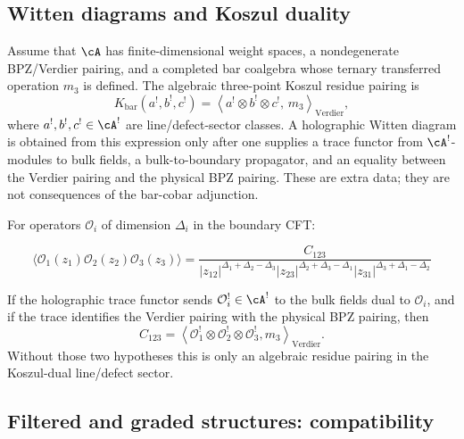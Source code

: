 \subsection{Witten diagrams and Koszul duality}

\begin{technique}
Assume that $\cA$ has finite-dimensional weight spaces, a
nondegenerate BPZ/Verdier pairing, and a completed bar coalgebra whose
ternary transferred operation $m_3$ is defined. The algebraic
three-point Koszul residue pairing is
\[
K_{\mathrm{bar}}(a^!,b^!,c^!)
=
\left\langle a^!\otimes b^!\otimes c^!,\,m_3\right\rangle_{\mathrm{Verdier}},
\]
where $a^!,b^!,c^!\in\cA^!$ are line/defect-sector classes. A
holographic Witten diagram is obtained from this expression only after
one supplies a trace functor from $\cA^!$-modules to bulk fields, a
bulk-to-boundary propagator, and an equality between the Verdier
pairing and the physical BPZ pairing. These are extra data; they are
not consequences of the bar-cobar adjunction.
\end{technique}

\begin{example}
For operators $\mathcal{O}_i$ of dimension $\Delta_i$ in the boundary CFT:

\[\langle \mathcal{O}_1(z_1) \mathcal{O}_2(z_2) \mathcal{O}_3(z_3) \rangle = \frac{C_{123}}{|z_{12}|^{\Delta_1+\Delta_2-\Delta_3}|z_{23}|^{\Delta_2+\Delta_3-\Delta_1}|z_{31}|^{\Delta_3+\Delta_1-\Delta_2}}\]

If the holographic trace functor sends
$\mathcal{O}_i^!\in\cA^!$ to the bulk fields dual to
$\mathcal{O}_i$, and if the trace identifies the Verdier pairing with
the physical BPZ pairing, then
\[
C_{123}
=
\left\langle
\mathcal{O}_1^!\otimes\mathcal{O}_2^!\otimes\mathcal{O}_3^!,
m_3
\right\rangle_{\mathrm{Verdier}}.
\]
Without those two hypotheses this is only an algebraic residue
pairing in the Koszul-dual line/defect sector.
\end{example}


\subsection{Filtered and graded structures: compatibility}


